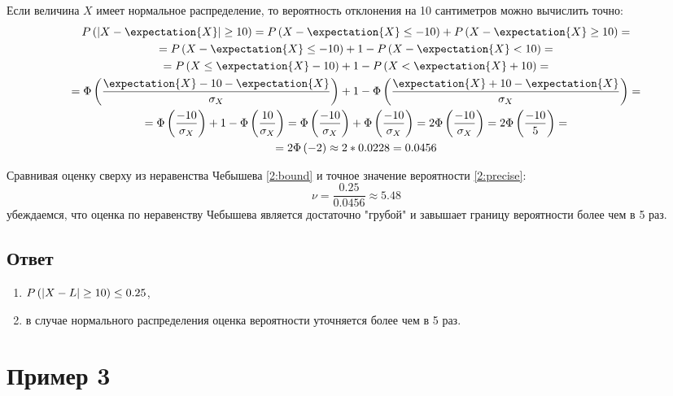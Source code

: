 \documentclass[a4paper,12pt]{article}
\begin{document}
    Если величина $X$ имеет нормальное распределение, то вероятность отклонения на 10 сантиметров можно вычислить точно:
    \begin{multline}
        \label{2:precise}
        \probability{\modulus{X - \expectation{X}} \ge 10}
        = \probability{X - \expectation{X} \le - 10} + \probability{ X - \expectation{X} \ge 10} = \\
        = \probability{X - \expectation{X} \le - 10} + 1 - \probability{ X - \expectation{X} < 10} = \\
        = \probability{X \le \expectation{X} - 10} + 1 - \probability{ X < \expectation{X} + 10} = \\
        = \Phi \left ( \frac{\expectation{X} - 10 - \expectation{X}}{\sigma_X} \right ) + 1 - \Phi \left ( \frac{\expectation{X} + 10 - \expectation{X}}{\sigma_X} \right ) = \\
        = \Phi \left ( \frac{- 10}{\sigma_X} \right ) + 1 - \Phi \left ( \frac{10}{\sigma_X} \right )
        = \Phi \left ( \frac{- 10}{\sigma_X} \right ) + \Phi \left ( \frac{- 10}{\sigma_X} \right )
        = 2 \Phi \left ( \frac{- 10}{\sigma_X} \right )
        = 2 \Phi \left ( \frac{- 10}{5} \right ) = \\
        = 2 \Phi \left ( - 2 \right )
        \approx 2 * 0.0228
        = 0.0456
    \end{multline}

    Сравнивая оценку сверху из неравенства Чебышева \eqref{2:bound} и точное значение вероятности \eqref{2:precise}:
    \begin{equation}
        \nu = \frac{0.25}{0.0456} \approx 5.48
    \end{equation}
    убеждаемся, что оценка по неравенству Чебышева является достаточно "грубой"{} и завышает границу вероятности более чем в 5 раз.
    \subsection*{Ответ}
    \begin{enumerate}
        \item $ P \left (  \left | X - L \right | \ge 10  \right ) \le 0.25 $,
        \item в случае нормального распределения оценка вероятности уточняется более чем в 5 раз.
    \end{enumerate}


    \section{Пример 3}
\end{document}
